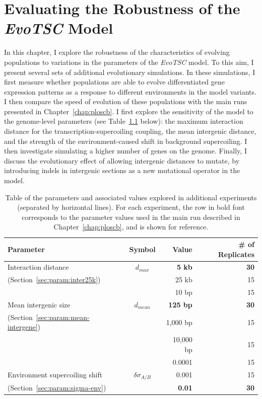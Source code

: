 \chapter{Evaluating the Robustness of the \emph{EvoTSC} Model}
\label{chap:param}

In this chapter, I explore the robustness of the characteristics of evolving populations to variations in the parameters of the \emph{EvoTSC} model.
To this aim, I present several sets of additional evolutionary simulations.
In these simulations, I first measure whether populations are able to evolve differentiated gene expression patterns as a response to different environments in the model variants.
I then compare the speed of evolution of these populations with  the main runs presented in Chapter~\ref{chap:ploscb}.
I first explore the sensitivity of the model to the genome-level parameters (see Table~\ref{tab:param:params} below): the maximum interaction distance for the transcription-supercoiling coupling, the mean intergenic distance, and the strength of the environment-caused shift in background supercoiling.
I then investigate simulating a higher number of genes on the genome.
Finally, I discuss the evolutionary effect of allowing intergenic distances to mutate, by introducing indels in intergenic sections as a new mutational operator in the model.

\begin{table}[H]
\begin{center}
\begin{tabular}{l c r r}
\toprule
\textbf{Parameter} & \textbf{Symbol} & \textbf{Value} & \textbf{\# of Replicates} \\
\midrule
Interaction distance & $d_{max}$ & \textbf{5 kb} & \textbf{30}\\
(Section~\ref{sec:param:inter25k}) & & 25 kb & 15\\
\midrule
& & 10 bp& 15\\
Mean intergenic size & $d_{mean}$ & \textbf{125 bp} & \textbf{30} \\
(Section~\ref{sec:param:mean-intergene})& & 1,000 bp & 15\\
& & 10,000 bp & 15 \\
\midrule
& & 0.0001 & 15\\
Environment supercoiling shift & $\delta\sigma_{A/B}$ & 0.001 & 15\\
(Section~\ref{sec:param:sigma-env})& & \textbf{0.01} & \textbf{30}\\
\bottomrule
\end{tabular}
\end{center}
\caption[Table of parameter values explored in additional \emph{EvoTSC} simulations]{Table of the parameters and associated values explored in additional experiments (separated by horizontal lines).
For each experiment, the row in bold font corresponds to the parameter values used in the main run described in Chapter~\ref{chap:ploscb}, and is shown for reference.}
\label{tab:param:params}
\end{table}

